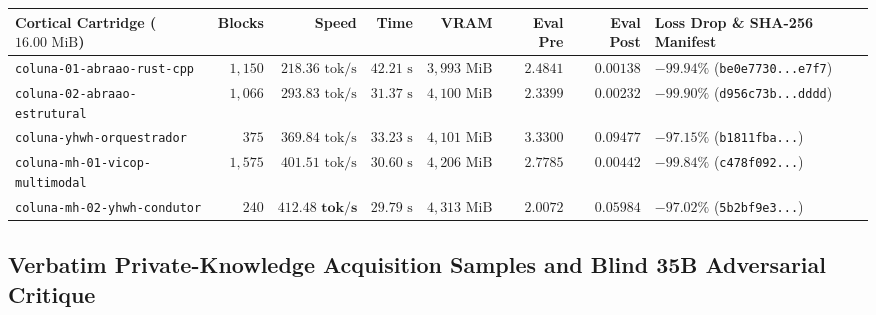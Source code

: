 \documentclass[10pt,a4paper]{article}
\begin{document}
\begin{table}[!htbp]
\vspace{4pt}
\begin{tabularx}{\linewidth}{@{}lrrrrrrY@{}}
\toprule
\textbf{Cortical Cartridge ($16.00\text{ MiB}$)} & \textbf{Blocks} & \textbf{Speed} & \textbf{Time} & \textbf{VRAM} & \textbf{Eval Pre} & \textbf{Eval Post} & \textbf{Loss Drop \& SHA-256 Manifest} \\
\midrule
\texttt{coluna-01-abraao-rust-cpp} & $1,150$ & $218.36\text{ tok/s}$ & $42.21\text{ s}$ & $3,993\text{ MiB}$ & $2.4841$ & $0.00138$ & $-99.94\%$ (\texttt{be0e7730...e7f7}) \\
\texttt{coluna-02-abraao-estrutural} & $1,066$ & $293.83\text{ tok/s}$ & $31.37\text{ s}$ & $4,100\text{ MiB}$ & $2.3399$ & $0.00232$ & $-99.90\%$ (\texttt{d956c73b...dddd}) \\
\texttt{coluna-yhwh-orquestrador} & $375$ & $369.84\text{ tok/s}$ & $33.23\text{ s}$ & $4,101\text{ MiB}$ & $3.3300$ & $0.09477$ & $-97.15\%$ (\texttt{b1811fba...}) \\
\texttt{coluna-mh-01-vicop-multimodal} & $1,575$ & $401.51\text{ tok/s}$ & $30.60\text{ s}$ & $4,206\text{ MiB}$ & $2.7785$ & $0.00442$ & $-99.84\%$ (\texttt{c478f092...}) \\
\texttt{coluna-mh-02-yhwh-condutor} & $240$ & $\mathbf{412.48\text{ tok/s}}$ & $29.79\text{ s}$ & $4,313\text{ MiB}$ & $2.0072$ & $0.05984$ & $-97.02\%$ (\texttt{5b2bf9e3...}) \\
\bottomrule
\end{tabularx}
\end{table}

\subsection{Verbatim Private-Knowledge Acquisition Samples and Blind 35B Adversarial Critique}
\end{document}
